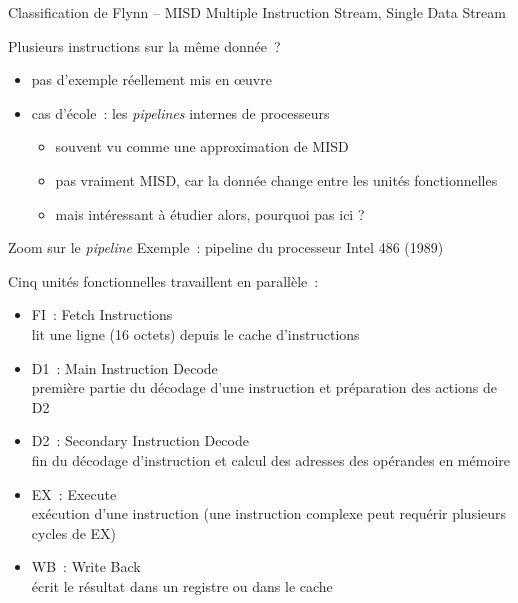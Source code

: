 \begin {frame} {Classification de Flynn -- MISD}
    Multiple Instruction Stream, Single Data Stream

    \vspace* {3mm}

    Plusieurs instructions sur la même donnée~?

    \begin {itemize}
	\item pas d'exemple réellement mis en {\oe}uvre
	\item cas d'école~: les \emph {pipelines} internes de processeurs

	    \begin {itemize}
		\item souvent vu comme une approximation de MISD

		\item pas vraiment MISD, car la donnée change entre
		    les unités fonctionnelles

		\item mais intéressant à étudier \implique alors,
		    pourquoi pas ici ?

	    \end {itemize}
    \end {itemize}

\end {frame}

\begin {frame} {Zoom sur le \emph {pipeline}}
    Exemple~: pipeline du processeur Intel 486 (1989)

    \vspace* {3mm}

    Cinq unités fonctionnelles travaillent en parallèle~:

    \begin {itemize}
	\item FI~: Fetch Instructions \\
	    {\small \implique lit une ligne (16 octets) depuis le cache
	    d'instructions}

	\item D1~: Main Instruction Decode \\
	    {\small \implique première partie du décodage d'une instruction
	    et préparation des actions de D2}

	\item D2~: Secondary Instruction Decode \\
	    {\small \implique fin du décodage d'instruction et calcul des
	    adresses des opérandes en mémoire}

	\item EX~: Execute \\
	    {\small \implique exécution d'une instruction (une instruction
	    complexe peut requérir plusieurs cycles de EX)}

	\item WB~: Write Back \\
	    {\small \implique écrit le résultat dans un registre ou
	    dans le cache}

    \end {itemize}

\end {frame}

